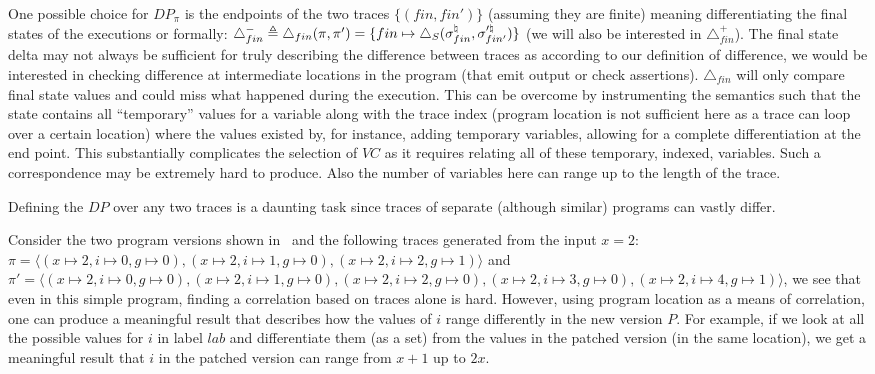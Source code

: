 One possible choice for $DP_{\pi}$ is the endpoints of the two traces $\{(fin,fin')\}$ (assuming they are finite) meaning differentiating the final states of the executions or formally: $\triangle_{fin}^{-} \triangleq \triangle_{fin}(\pi,\pi') = \{fin\mapsto\triangle_{S}(\sigma^\natural_{fin},\sigma'^\natural_{fin'})\}$ (we will also be interested in $\triangle_{fin}^{+}$). The final state delta may not always be sufficient for truly describing the difference between traces as according to our definition of difference, we would be interested in checking difference at intermediate locations in the program (that emit output or check assertions). $\triangle_{fin}$ will only compare final state values and could miss what happened during the execution. This can be overcome by instrumenting the semantics such that the state contains all ``temporary'' values for a variable along with the trace index (program location is not sufficient here as a trace can loop over a certain location) where the values existed by, for instance, adding temporary variables, allowing for a complete differentiation at the end point. This substantially complicates the selection of $VC$ as it requires relating all of these temporary, indexed, variables. Such a correspondence may be extremely hard to produce. Also the number of variables here can range up to the length of the trace.

Defining the $DP$ over any two traces is a daunting task since traces of separate (although similar) programs can vastly differ.
\begin{Example}
Consider the two program versions shown in~ and the following traces generated from the input $x=2$: $\pi = \langle (x \mapsto 2,i \mapsto 0, g \mapsto 0),(x \mapsto 2,i \mapsto 1, g \mapsto 0),(x \mapsto 2,i \mapsto 2, g \mapsto 1) \rangle$ and $\pi' = \langle (x \mapsto 2,i \mapsto 0, g \mapsto 0),(x \mapsto 2,i \mapsto 1, g \mapsto 0),(x \mapsto 2,i \mapsto 2, g \mapsto 0),(x \mapsto 2,i \mapsto 3, g \mapsto 0),(x \mapsto 2,i \mapsto 4, g \mapsto 1)\rangle$, we see that even in this simple program, finding a correlation based on traces alone is hard.
However, using program location as a means of correlation, one can produce a meaningful result that describes how the values of $i$ range differently in the new version $P$. For example, if we look at all the possible values for $i$ in label $lab$ and differentiate them (as a set) from the values in the patched version (in the same location), we get a meaningful result that $i$ in the patched version can range from $x+1$ up to $2x$.
\end{Example}


